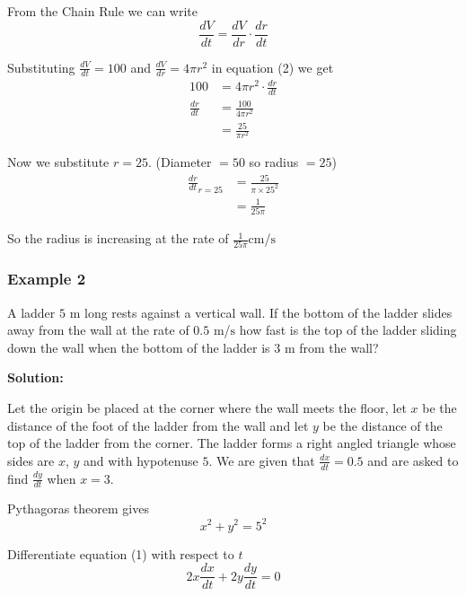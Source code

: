 From the Chain Rule we can write
\begin{equation}\frac{d V}{d t} =\frac{d V}{d r} \cdot \frac{d r}{d t}\tag{2}
\end{equation}

Substituting $\frac{d V}{d t} =100$ and $\frac{d V}{d r} =4 \pi  r^{2}$ in equation (2) we get
\begin{align*}100 &  = 4 \pi  r^{2} \cdot \frac{d r}{d t} \\
\frac{d r}{d t} &  = \frac{100}{4 \pi  r^{2}} \\
 &  = \frac{25}{\pi  r^{2}}\end{align*}

Now we substitute $r =25$. (Diameter $ =50$ so radius $ =25$)
\begin{align*}\frac{d r}{d t}_{r =25} &  = \frac{25}{\pi  \times 25^{2}} \\
 &  = \frac{1}{25 \pi }\end{align*}

So the radius is increasing at the rate of $\frac{1}{25 \pi } \mbox{cm}$/$\mbox{s}$ 

\subsubsection{Example 2}
A ladder $5$ $\mbox{m}$ long rests against a vertical wall. If
the bottom of the ladder slides away from the wall at the rate of $0.5$ $\mbox{m}$/$\mbox{s}$ how fast is the top of the ladder sliding down the wall when the bottom
of the ladder is $3$ $\mbox{m}$ from the wall? 

\textbf{Solution:} 

Let the origin be placed at the corner where the wall meets the floor, let $x$ be the distance of the foot of the ladder from the wall and let $y$ be the distance of the top of the ladder from the corner. The ladder forms a right
angled triangle whose sides are $x$, $y$ and with hypotenuse $5$. We are given that $\frac{d x}{d t} =0.5$ and are asked to find $\frac{d y}{d t}$ when $x =3$. 

Pythagoras theorem gives
\begin{equation}x^{2} +y^{2} =5^{2}\tag{1}
\end{equation}

Differentiate equation (1) with respect to $t$
\begin{equation*}2 x \frac{d x}{d t} +2 y \frac{d y}{d t} =0
\end{equation*}

